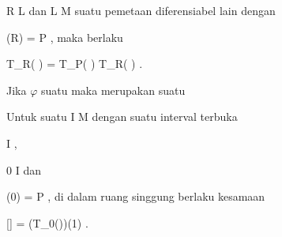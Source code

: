 {{{\mavergleichskette
{\vergleichskette
{R
}
{ \in }{ L
}
{  }{
}
{    }{
}
{   }{
}
}
{}{}{}
dan
\maabbdisp {\psi} { L } { M
} {}
suatu pemetaan diferensiabel lain dengan

\mavergleichskette
{\vergleichskette
{ \psi(R)
}
{ = }{ P
}
{  }{
}
{    }{
}
{   }{
}
}
{}{}{}
,
maka berlaku

\mavergleichskettedisp
{\vergleichskette
{ T_R( \varphi \circ \psi)
}
{ =} { T_P( \varphi) \circ T_R( \psi)
}
{ } {
}
{ } {
}
{ } {
}
}
{}{}{.}
}{Jika $\varphi$ suatu
maka
merupakan suatu
}{Untuk suatu
\maabbdisp {\gamma} { I } { M
} {}
dengan suatu interval terbuka

\mavergleichskette
{\vergleichskette
{I
}
{ \subseteq }{\R
}
{  }{
}
{    }{
}
{   }{
}
}
{}{}{,}

\mavergleichskette
{\vergleichskette
{ 0
}
{ \in }{ I
}
{  }{
}
{    }{
}
{   }{
}
}
{}{}{}
dan

\mavergleichskette
{\vergleichskette
{ \gamma(0)
}
{ = }{ P
}
{  }{
}
{    }{
}
{   }{
}
}
{}{}{}
,
di dalam ruang singgung
berlaku kesamaan

\mavergleichskettedisp
{\vergleichskette
{ [\gamma]
}
{ =} { (T_0(\gamma))(1)
}
{ } {
}
{ } {
}
{ } {
}
}
{}{}{.}
}}
\faktzusatz {}
\faktzusatz {}

}
